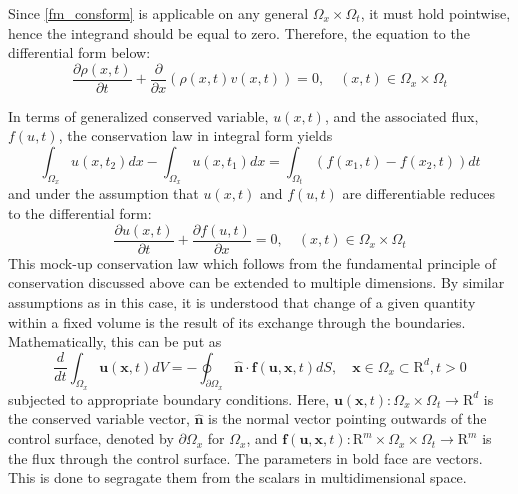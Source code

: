 \documentclass[11pt, a4paper]{report}
\begin{document}
Since \eqref{fm_consform} is applicable on any general $\Omega_x\times\Omega_t$, it must hold pointwise, hence 
the integrand should be equal to zero. Therefore, the equation to the differential form below:
\begin{equation*}
    \frac{\partial \rho(x, t)}{\partial t} + \frac{\partial}{\partial x}(\rho(x, t)v(x, t)) = 0, \quad (x, t)\in\Omega_{x}\times\Omega_{t}
\end{equation*}

In terms of generalized conserved variable, $u(x, t)$, and the associated flux, $f(u, t)$, the conservation law in 
integral form yields
\begin{equation} \label{gen_consform}
    \int_{\Omega_{x}}u\left(x, t_{2}\right)dx - \int_{\Omega_{x}} u\left(x, t_{1}\right)dx = \int_{\Omega_{t}} (f\left(x_{1}, t\right) - f\left(x_{2}, t\right))dt
\end{equation} 
and under the assumption that $u(x, t)$ and $f(u, t)$ are differentiable reduces to the differential form:
\begin{equation*}
    \frac{\partial u(x, t)}{\partial t} + \frac{\partial f(u, t)}{\partial x} = 0, \quad (x, t)\in\Omega_{x}\times\Omega_{t}
\end{equation*}
This mock-up conservation law which follows from the fundamental principle of conservation discussed above can be
extended to multiple dimensions. By similar assumptions as in this case, it is understood that change of a given 
quantity within a fixed volume is the result of its exchange through the boundaries. Mathematically, this can be 
put as
\begin{equation*}
    \frac{d}{dt}\int_{\Omega_{x}}{\bm u}({\bm x}, t)dV = - \oint_{\partial \Omega_{x}} {\bm {\hat{n}}} \cdot {\bm f}({\bm u}, {\bm x}, t)dS, \quad {\bm x}\in\Omega_{x}\subset\mathrm{R}^{d}, t>0
\end{equation*}
subjected to appropriate boundary conditions.
Here, ${\bm {u}}({\bm x}, t):\Omega_{x}\times\Omega_{t}\rightarrow\mathrm{R}^{d}$ is the conserved variable vector, 
$\bm {\hat {n}}$ is the normal vector pointing outwards of the control surface, denoted by $\partial \Omega_x$ for
$\Omega_x$, and ${\bm f}({\bm u}, {\bm x}, t) : \mathrm {R}^{m}\times\Omega_{x}\times\Omega_{t} \rightarrow \mathrm {R}^{m}$
is the flux through the control surface. The parameters in bold face are vectors. This is done to segragate them from
the scalars in multidimensional space. 
\end{document}

